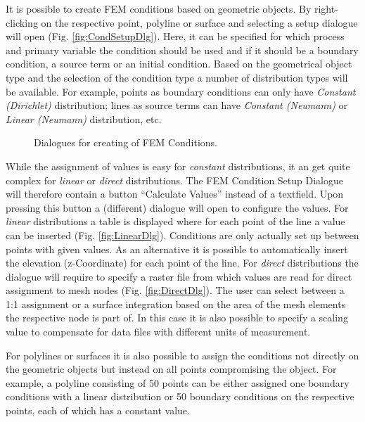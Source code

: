 It is possible to create FEM conditions based on geometric objects. By right-clicking on the respective point, polyline or surface and selecting  a setup dialogue will open (Fig. \ref{fig:CondSetupDlg}). Here, it can be specified for which process and primary variable the condition should be used and if it should be a boundary condition, a source term or an initial condition. Based on the geometrical object type and the selection of the condition type a number of distribution types will be available. For example, points as boundary conditions can only have \emph{Constant (Dirichlet)} distribution; lines as source terms can have \emph{Constant (Neumann)} or \emph{Linear (Neumann)} distribution, etc.

\begin{figure}[tb]
\begin{center}
\enspace
{}\enspace
{}
\end{center}
\caption{Dialogues for creating of FEM Conditions.} \label{fig:CondSetup}
\end{figure}

While the assignment of values is easy for \emph{constant} distributions, it an get quite complex for \emph{linear} or \emph{direct} distributions. The FEM Condition Setup Dialogue will therefore contain a button ``Calculate Values'' instead of a textfield. Upon pressing this button a (different) dialogue will open to configure the values. For \emph{linear} distributions a table is displayed where for each point of the line a value can be inserted (Fig. \ref{fig:LinearDlg}). Conditions are only actually set up between points with given values. As an alternative it is possible to automatically insert the elevation (z-Coordinate) for each point of the line. For \emph{direct} distributions the dialogue will require to specify a raster file from which values are read for direct assignment to mesh nodes (Fig. \ref{fig:DirectDlg}). The user can select between a 1:1 assignment or a surface integration based on the area of the mesh elements the respective node is part of. In this case it is also possible to specify a scaling value to compensate for data files with different units of measurement.

For polylines or surfaces it is also possible to assign the conditions not directly on the geometric objects but instead on all points compromising the object. For example, a polyline consisting of 50 points can be either assigned one boundary conditions with a linear distribution or 50 boundary conditions on the respective points, each of which has a constant value.

